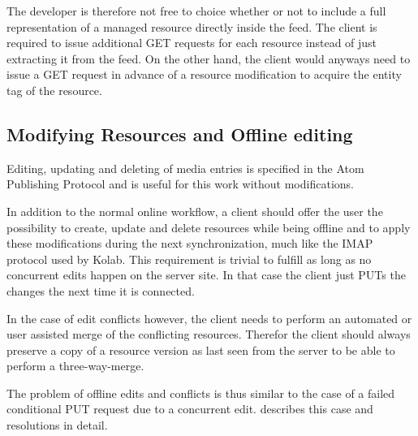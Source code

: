 \documentclass[11pt,a4paper,headsepline,twoside]{scrartcl}		%
\newcommand{\citeurl}[2]{\url{#1} (#2)}
\begin{document}
The developer is therefore not free to choice whether or not to include a full
representation of a managed resource directly inside the feed. The client is
required to issue additional GET requests for each resource instead of just
extracting it from the feed. On the other hand, the client would anyways need to
issue a GET request in advance of a resource modification to acquire the entity
tag of the resource.

\subsection{Modifying Resources and Offline editing}

Editing, updating and deleting of media entries is specified in the Atom
Publishing Protocol and is useful for this work without modifications.


In addition to the normal online workflow, a client should offer the user the
possibility to create, update and delete resources while being offline and to
apply these modifications during the next synchronization, much like the IMAP
protocol used by Kolab. This requirement is trivial to fulfill as long as no
concurrent edits happen on the server site. In that case the client just PUTs
the changes the next time it is connected.

In the case of edit conflicts however, the client needs to perform an automated
or user assisted merge of the conflicting resources. Therefor the client should
always preserve a copy of a resource version as last seen from the server to be
able to perform a three-way-merge.

The problem of offline edits and conflicts is thus similar to the case of a
failed conditional PUT request due to a concurrent edit. \cite{Nielsen1999}
describes this case and resolutions in detail.
\end{document}
